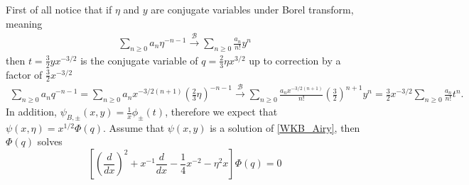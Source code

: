 \documentclass{article}
\newcommand{\borel}{\mathcal{B}}
\theoremstyle{definition}
\theoremstyle{plain}
\begin{document}
First of all notice that if $\eta$ and $y$ are conjugate variables under Borel transform, meaning 
\begin{align*}
\sum_{n\geq 0}a_n\eta^{-n-1}  \overset{\borel}{\longrightarrow} \sum_{n\geq 0}\frac{a_n}{n!} y^{n} 
\end{align*} 
then $t=\frac{3}{2}yx^{-3/2}$ is the conjugate variable of $q=\frac{2}{3}\eta x^{3/2}$ up to correction by a factor of $\frac{3}{2}x^{-3/2}$
\begin{align*}
\sum_{n\geq 0}a_nq^{-n-1}=\sum_{n\geq 0}a_nx^{-3/2(n+1)}\left(\frac{2}{3}\eta\right)^{-n-1}  \overset{\borel}{\longrightarrow} \sum_{n\geq 0}\frac{a_nx^{-3/2(n+1)}}{n!}\left(\frac{3}{2}\right)^{n+1}  y^{n}=\frac{3}{2}x^{-3/2}\sum_{n\geq 0}\frac{a_n}{n!} t^{n}. 
\end{align*}
In addition, $\psi_{B,\pm}(x,y)=\frac{1}{x}\phi_{\pm}(t)$, therefore we expect that $\psi(x,\eta)=x^{1/2}\Phi(q)$. Assume that $\psi(x,y)$ is a solution of \eqref{WKB_Airy}, then $\Phi(q)$ solves 
\begin{equation}
\label{eq_Phi}
\left[\left(\frac{d}{dx}\right)^2+x^{-1}\frac{d}{dx}-\frac{1}{4}x^{-2} - \eta^2 x \right] \Phi(q) = 0
\end{equation}
\end{document}
